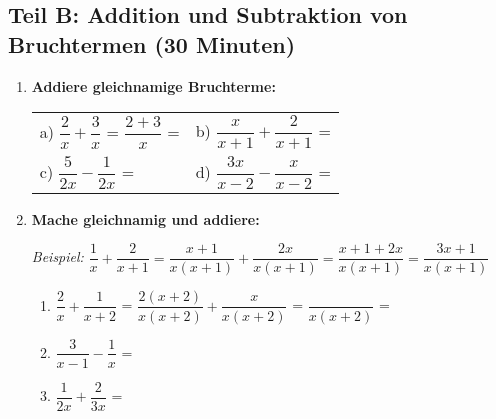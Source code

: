 \subsection*{Teil B: Addition und Subtraktion von Bruchtermen (30 Minuten)}

\begin{enumerate}[label=\arabic*., resume]

    \item \textbf{Addiere gleichnamige Bruchterme:}
    \vspace{0.5cm}

    \begin{tabular}{ll}
        a) $\dfrac{2}{x} + \dfrac{3}{x}$ = $\dfrac{2+3}{x}$ = \underline{\hspace{2cm}} & b) $\dfrac{x}{x+1} + \dfrac{2}{x+1}$ = \underline{\hspace{2cm}} \\[4ex]
        c) $\dfrac{5}{2x} - \dfrac{1}{2x}$ = \underline{\hspace{2cm}} & d) $\dfrac{3x}{x-2} - \dfrac{x}{x-2}$ = \underline{\hspace{2cm}}
    \end{tabular}

    \vspace{1cm}

    \item \textbf{Mache gleichnamig und addiere:}
    \vspace{0.5cm}

    \textit{Beispiel:} $\dfrac{1}{x} + \dfrac{2}{x+1} = \dfrac{x+1}{x(x+1)} + \dfrac{2x}{x(x+1)} = \dfrac{x+1+2x}{x(x+1)} = \dfrac{3x+1}{x(x+1)}$

    \begin{enumerate}[label=\alph*)]
        \item $\dfrac{2}{x} + \dfrac{1}{x+2}$ = $\dfrac{2(x+2)}{x(x+2)} + \dfrac{x}{x(x+2)}$ = $\dfrac{\phantom{2x+4+x}}{x(x+2)}$ = \underline{\hspace{3cm}}
        \vspace{0.8cm}
        \item $\dfrac{3}{x-1} - \dfrac{1}{x}$ = \underline{\hspace{8cm}}
        \vspace{0.8cm}
        \item $\dfrac{1}{2x} + \dfrac{2}{3x}$ = \underline{\hspace{8cm}}
    \end{enumerate}

    \vspace{1cm}


\end{enumerate}
